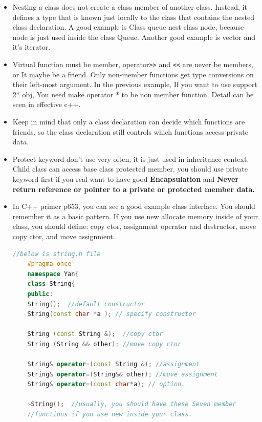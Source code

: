 \documentclass[a4paper,12pt,twoside]{book}
\begin{document}
\begin{itemize}
	
	\item Nesting a class does not create a class member of another class. Instead, it defines a type that is known just locally to the class that contains the nested class declaration.  A good example is Class queue nest class node,  because node is just used inside the class Queue. Another good example is vector and it's iterator.
	
	\item Virtual function must be member, operator\verb=>>= and \verb=<<= are never be members, or It maybe be a friend. Only non-member functions get type conversions on their left-most argument.  In the previous example, If you want to use support 2* obj, You need make operator * to be non member function.  Detail can be seen in effective c++.
	
	\item Keep in mind that only a class declaration can decide which functions are friends, so the class declaration still controls which functions access private data.
	
	\item Protect keyword don't use very often, it is just used in inheritance context. Child class can access base class protected member. you should use private keyword first if you real want to have good \textbf{Encapsulation} and \textbf{Never return reference or pointer to a private or protected member data.}
	
	\item In C++ primer p653, you can see a good example class interface. You should remember it as a basic pattern.  If you use new allocate memory inside of your class, you should define: copy ctor, assignment operator and destructor, move copy ctor, and move assignment.
	
	\begin{lstlisting}[frame=single, language=c++]
	//below is string.h file
	#pragma once
	namespace Yan{
	class String{
	public:
	String();  //default constructor
	String(const char *a ); // specify constructor
	
	String (const String &);  //copy ctor
	String (String && other); //move copy ctor
	
	String& operator=(const String &); //assignment
	String& operator=(String&& other); //move assignment
	String& operator=(const char*a); // option.
	
	~String();  //usually, you should have these Seven member
	//functions if you use new inside your class.
	

\end{lstlisting}
\end{itemize}
\end{document}
